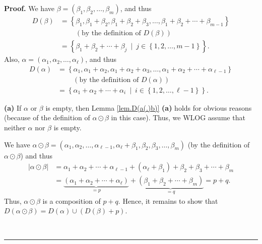 \documentclass[numbers=enddot,12pt,final,onecolumn,notitlepage,abstracton]{scrartcl}%
\theoremstyle{definition}
\newenvironment{proof}[1][Proof]{\noindent\textbf{#1.} }{\ \rule{0.5em}{0.5em}}
\newenvironment{verlong}{}{}
\begin{document}
\begin{verlong}
\begin{proof}
We have $\beta=\left(  \beta_{1},\beta_{2},\ldots,\beta_{m}\right)  $, and
thus%
\begin{align*}
D\left(  \beta\right)   &  =\left\{  \beta_{1},\beta_{1}+\beta_{2},\beta
_{1}+\beta_{2}+\beta_{3},\ldots,\beta_{1}+\beta_{2}+\cdots+\beta_{m-1}\right\}
\\
&  \ \ \ \ \ \ \ \ \ \ \left(  \text{by the definition of }D\left(
\beta\right)  \right) \\
&  =\left\{  \beta_{1}+\beta_{2}+\cdots+\beta_{j}\ \mid\ j\in\left\{
1,2,\ldots,m-1\right\}  \right\}  .
\end{align*}
Also, $\alpha=\left(  \alpha_{1},\alpha_{2},\ldots,\alpha_{\ell}\right)  $,
and thus%
\begin{align*}
D\left(  \alpha\right)   &  =\left\{  \alpha_{1},\alpha_{1}+\alpha_{2}%
,\alpha_{1}+\alpha_{2}+\alpha_{3},\ldots,\alpha_{1}+\alpha_{2}+\cdots
+\alpha_{\ell-1}\right\} \\
&  \ \ \ \ \ \ \ \ \ \ \left(  \text{by the definition of }D\left(
\alpha\right)  \right) \\
&  =\left\{  \alpha_{1}+\alpha_{2}+\cdots+\alpha_{i}\ \mid\ i\in\left\{
1,2,\ldots,\ell-1\right\}  \right\}  .
\end{align*}


\textbf{(a)} If $\alpha$ or $\beta$ is empty, then Lemma \ref{lem.D(a(.)b)}
\textbf{(a)} holds for obvious reasons (because of the definition of
$\alpha\odot\beta$ in this case). Thus, we WLOG assume that neither $\alpha$
nor $\beta$ is empty.

We have $\alpha\odot\beta=\left(  \alpha_{1},\alpha_{2},\ldots,\alpha_{\ell
-1},\alpha_{\ell}+\beta_{1},\beta_{2},\beta_{3},\ldots,\beta_{m}\right)  $ (by
the definition of $\alpha\odot\beta$) and thus%
\begin{align*}
\left\vert \alpha\odot\beta\right\vert  &  =\alpha_{1}+\alpha_{2}%
+\cdots+\alpha_{\ell-1}+\left(  \alpha_{\ell}+\beta_{1}\right)  +\beta
_{2}+\beta_{3}+\cdots+\beta_{m}\\
&  =\underbrace{\left(  \alpha_{1}+\alpha_{2}+\cdots+\alpha_{\ell}\right)
}_{=p}+\underbrace{\left(  \beta_{1}+\beta_{2}+\cdots+\beta_{m}\right)  }%
_{=q}=p+q.
\end{align*}
Thus, $\alpha\odot\beta$ is a composition of $p+q$. Hence, it remains to show
that $D\left(  \alpha\odot\beta\right)  =D\left(  \alpha\right)  \cup\left(
D\left(  \beta\right)  +p\right)  $.


\end{proof}
\end{verlong}
\end{document}
